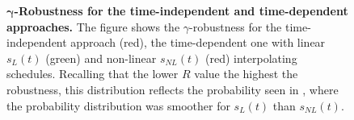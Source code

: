 
\begin{figure}[ht]
  \centering
  \caption{\textbf{$\bm{\gamma}$-Robustness for the time-independent and time-dependent approaches.} The figure shows the $\gamma$-robustness for the time-independent approach (red), the time-dependent one with linear $s_L(t)$ (green) and non-linear $s_{NL}(t)$ (red) interpolating schedules. Recalling that the lower $R$ value the highest the robustness, this distribution reflects the probability seen in , where the probability distribution was smoother for $s_L(t)$ than $s_{NL}(t)$.}
\end{figure}
